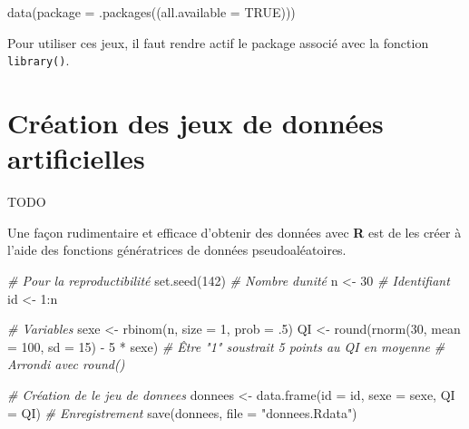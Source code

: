 \documentclass[
]{book}
\newenvironment{Shaded}{}{}
\newcommand{\AttributeTok}[1]{#1}
\newcommand{\CommentTok}[1]{\textit{#1}}
\newcommand{\ConstantTok}[1]{#1}
\newcommand{\DecValTok}[1]{#1}
\newcommand{\FunctionTok}[1]{#1}
\newcommand{\NormalTok}[1]{#1}
\newcommand{\OtherTok}[1]{#1}
\newcommand{\SpecialCharTok}[1]{#1}
\newcommand{\StringTok}[1]{#1}
\begin{document}
\begin{Shaded}
\begin{Highlighting}[]
\FunctionTok{data}\NormalTok{(}\AttributeTok{package =} \FunctionTok{.packages}\NormalTok{((}\AttributeTok{all.available =} \ConstantTok{TRUE}\NormalTok{)))}
\end{Highlighting}
\end{Shaded}

Pour utiliser ces jeux, il faut rendre actif le package associé avec la fonction \texttt{library()}.

\hypertarget{cruxe9ation-des-jeux-de-donnuxe9es-artificielles}{%
\section{Création des jeux de données artificielles}\label{cruxe9ation-des-jeux-de-donnuxe9es-artificielles}}

TODO

Une façon rudimentaire et efficace d'obtenir des données avec \textbf{R} est de les créer à l'aide des fonctions génératrices de données pseudoaléatoires.

\begin{Shaded}
\begin{Highlighting}[]
\CommentTok{\# Pour la reproductibilité}
\FunctionTok{set.seed}\NormalTok{(}\DecValTok{142}\NormalTok{)}
\CommentTok{\# Nombre d\textquotesingle{}unité}
\NormalTok{n }\OtherTok{\textless{}{-}} \DecValTok{30}
\CommentTok{\# Identifiant}
\NormalTok{id }\OtherTok{\textless{}{-}} \DecValTok{1}\SpecialCharTok{:}\NormalTok{n}

\CommentTok{\# Variables}
\NormalTok{sexe }\OtherTok{\textless{}{-}} \FunctionTok{rbinom}\NormalTok{(n, }\AttributeTok{size =} \DecValTok{1}\NormalTok{, }\AttributeTok{prob =}\NormalTok{ .}\DecValTok{5}\NormalTok{)}
\NormalTok{QI }\OtherTok{\textless{}{-}}  \FunctionTok{round}\NormalTok{(}\FunctionTok{rnorm}\NormalTok{(}\DecValTok{30}\NormalTok{, }\AttributeTok{mean =} \DecValTok{100}\NormalTok{, }\AttributeTok{sd =} \DecValTok{15}\NormalTok{) }\SpecialCharTok{{-}} \DecValTok{5} \SpecialCharTok{*}\NormalTok{ sexe)}
\CommentTok{\# Être "1" soustrait  5 points au QI en moyenne}
\CommentTok{\# Arrondi avec round()}

\CommentTok{\# Création de le jeu de donnees}
\NormalTok{donnees }\OtherTok{\textless{}{-}}  \FunctionTok{data.frame}\NormalTok{(}\AttributeTok{id =}\NormalTok{ id, }\AttributeTok{sexe =}\NormalTok{ sexe, }\AttributeTok{QI =}\NormalTok{ QI)}
\CommentTok{\# Enregistrement}
\FunctionTok{save}\NormalTok{(donnees, }\AttributeTok{file =} \StringTok{"donnees.Rdata"}\NormalTok{)}
\end{Highlighting}
\end{Shaded}
\end{document}
